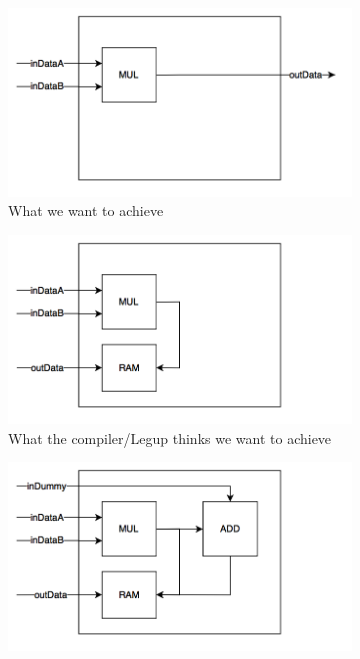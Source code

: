 \begin{figure}
        \centering
        \begin{subfigure}{0.49\textwidth}\centering%
                    \includegraphics[width=\linewidth]{figs/OutputAssignment1.png}
                \caption{What we want to achieve}
  \label{fig:assignoutputs1}
       \end{subfigure}%
    \hfill
        \begin{subfigure}{0.49\textwidth}\centering
                    \includegraphics[width=\linewidth]{figs/OutputAssignment2.png}
                \caption{What the compiler/Legup thinks we want to achieve}
  \label{fig:assignoutputs2}
       \end{subfigure}%
    \hfill
        \begin{subfigure}{0.49\textwidth}\centering
                    \includegraphics[width=\linewidth]{figs/OutputAssignment3.png}

\end{subfigure}
\end{figure}
